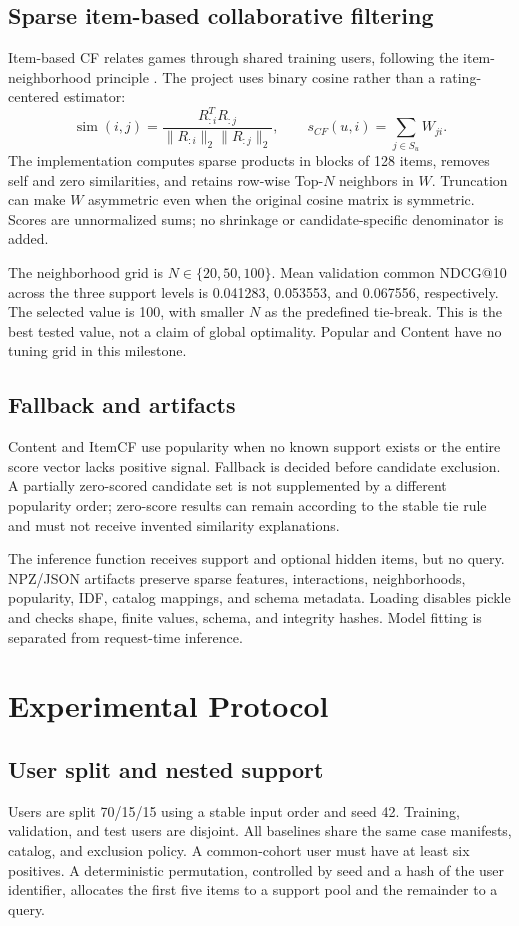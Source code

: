 \documentclass[conference,a4paper]{IEEEtran}
\begin{document}
\subsection{Sparse item-based collaborative filtering}
Item-based CF relates games through shared training users, following the item-neighborhood principle \cite{sarwar}. The project uses binary cosine rather than a rating-centered estimator:
\begin{equation}
\operatorname{sim}(i,j)=\frac{R_{:i}^{T}R_{:j}}
{\|R_{:i}\|_2\|R_{:j}\|_2},\qquad
s_{CF}(u,i)=\sum_{j\in S_u}W_{ji}.
\end{equation}
The implementation computes sparse products in blocks of 128 items, removes self and zero similarities, and retains row-wise Top-$N$ neighbors in $W$. Truncation can make $W$ asymmetric even when the original cosine matrix is symmetric. Scores are unnormalized sums; no shrinkage or candidate-specific denominator is added.

The neighborhood grid is $N\in\{20,50,100\}$. Mean validation common NDCG@10 across the three support levels is 0.041283, 0.053553, and 0.067556, respectively. The selected value is 100, with smaller $N$ as the predefined tie-break. This is the best tested value, not a claim of global optimality. Popular and Content have no tuning grid in this milestone.

\subsection{Fallback and artifacts}
Content and ItemCF use popularity when no known support exists or the entire score vector lacks positive signal. Fallback is decided before candidate exclusion. A partially zero-scored candidate set is not supplemented by a different popularity order; zero-score results can remain according to the stable tie rule and must not receive invented similarity explanations.

The inference function receives support and optional hidden items, but no query. NPZ/JSON artifacts preserve sparse features, interactions, neighborhoods, popularity, IDF, catalog mappings, and schema metadata. Loading disables pickle and checks shape, finite values, schema, and integrity hashes. Model fitting is separated from request-time inference.

\section{Experimental Protocol}
\subsection{User split and nested support}
Users are split 70/15/15 using a stable input order and seed 42. Training, validation, and test users are disjoint. All baselines share the same case manifests, catalog, and exclusion policy. A common-cohort user must have at least six positives. A deterministic permutation, controlled by seed and a hash of the user identifier, allocates the first five items to a support pool and the remainder to a query.
\end{document}

